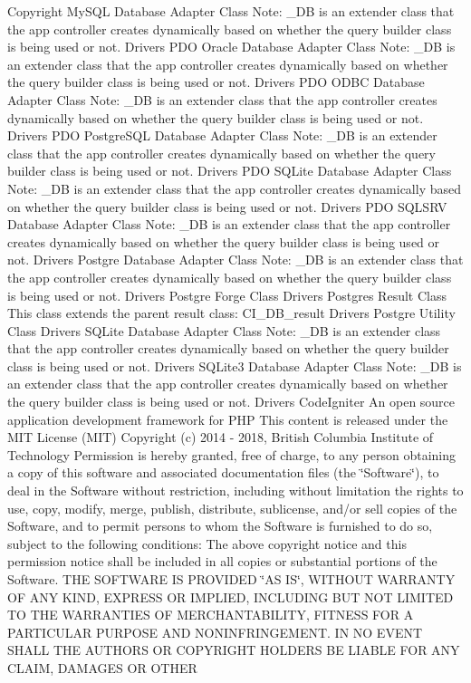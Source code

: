 \begin{DoxyCopyright}{Copyright}
My\+S\+QL Database Adapter Class Note\+: \+\_\+\+DB is an extender class that the app controller creates dynamically based on whether the query builder class is being used or not.  Drivers P\+DO Oracle Database Adapter Class Note\+: \+\_\+\+DB is an extender class that the app controller creates dynamically based on whether the query builder class is being used or not.  Drivers P\+DO O\+D\+BC Database Adapter Class Note\+: \+\_\+\+DB is an extender class that the app controller creates dynamically based on whether the query builder class is being used or not.  Drivers P\+DO Postgre\+S\+QL Database Adapter Class Note\+: \+\_\+\+DB is an extender class that the app controller creates dynamically based on whether the query builder class is being used or not.  Drivers P\+DO S\+Q\+Lite Database Adapter Class Note\+: \+\_\+\+DB is an extender class that the app controller creates dynamically based on whether the query builder class is being used or not.  Drivers P\+DO S\+Q\+L\+S\+RV Database Adapter Class Note\+: \+\_\+\+DB is an extender class that the app controller creates dynamically based on whether the query builder class is being used or not.  Drivers Postgre Database Adapter Class Note\+: \+\_\+\+DB is an extender class that the app controller creates dynamically based on whether the query builder class is being used or not.  Drivers Postgre Forge Class  Drivers Postgres Result Class This class extends the parent result class\+: C\+I\+\_\+\+D\+B\+\_\+result  Drivers Postgre Utility Class  Drivers S\+Q\+Lite Database Adapter Class Note\+: \+\_\+\+DB is an extender class that the app controller creates dynamically based on whether the query builder class is being used or not.  Drivers S\+Q\+Lite3 Database Adapter Class Note\+: \+\_\+\+DB is an extender class that the app controller creates dynamically based on whether the query builder class is being used or not.  Drivers Code\+Igniter An open source application development framework for P\+HP This content is released under the M\+IT License (M\+IT) Copyright (c) 2014 -\/ 2018, British Columbia Institute of Technology Permission is hereby granted, free of charge, to any person obtaining a copy of this software and associated documentation files (the \char`\"{}\+Software\char`\"{}), to deal in the Software without restriction, including without limitation the rights to use, copy, modify, merge, publish, distribute, sublicense, and/or sell copies of the Software, and to permit persons to whom the Software is furnished to do so, subject to the following conditions\+: The above copyright notice and this permission notice shall be included in all copies or substantial portions of the Software. T\+HE S\+O\+F\+T\+W\+A\+RE IS P\+R\+O\+V\+I\+D\+ED \char`\"{}\+A\+S I\+S\char`\"{}, W\+I\+T\+H\+O\+UT W\+A\+R\+R\+A\+N\+TY OF A\+NY K\+I\+ND, E\+X\+P\+R\+E\+SS OR I\+M\+P\+L\+I\+ED, I\+N\+C\+L\+U\+D\+I\+NG B\+UT N\+OT L\+I\+M\+I\+T\+ED TO T\+HE W\+A\+R\+R\+A\+N\+T\+I\+ES OF M\+E\+R\+C\+H\+A\+N\+T\+A\+B\+I\+L\+I\+TY, F\+I\+T\+N\+E\+SS F\+OR A P\+A\+R\+T\+I\+C\+U\+L\+AR P\+U\+R\+P\+O\+SE A\+ND N\+O\+N\+I\+N\+F\+R\+I\+N\+G\+E\+M\+E\+NT. IN NO E\+V\+E\+NT S\+H\+A\+LL T\+HE A\+U\+T\+H\+O\+RS OR C\+O\+P\+Y\+R\+I\+G\+HT H\+O\+L\+D\+E\+RS BE L\+I\+A\+B\+LE F\+OR A\+NY C\+L\+A\+IM, D\+A\+M\+A\+G\+ES OR O\+T\+H\+ER 
\end{DoxyCopyright}
